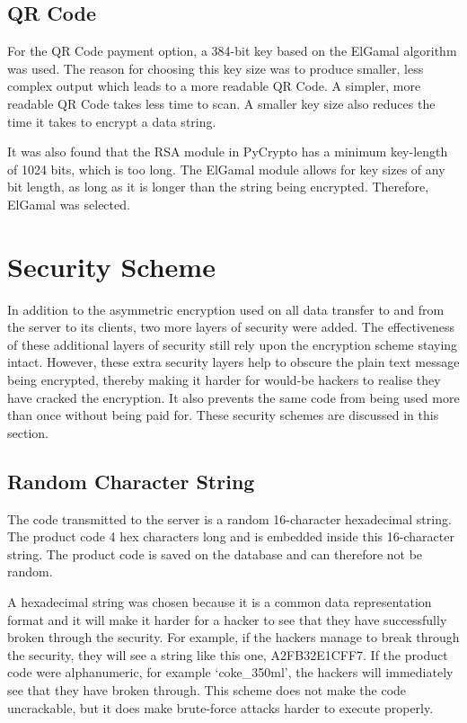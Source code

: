 \subsection{QR Code}

For the QR Code payment option, a 384-bit key based on the ElGamal algorithm was
used. The reason for choosing this key size was to produce smaller, less complex
output which leads to a more readable QR Code. A simpler, more readable QR Code
takes less time to scan. A smaller key size also reduces the time it takes to
encrypt a data string.

It was also found that the RSA module in PyCrypto has a minimum key-length of 1024
bits, which is too long. The ElGamal module allows for key sizes of any bit
length, as long as it is longer than the string being encrypted. Therefore, ElGamal was
selected. 

\section{Security Scheme}
\label{sec:security-code-scheme}

In addition to the asymmetric encryption used on all data transfer to and from
the server to its clients, two more layers of security were added. The effectiveness of
these additional layers of security still rely upon the encryption scheme staying intact.
However, these extra security layers help to obscure the plain text message being
encrypted, thereby making it harder for would-be hackers to realise they have cracked the
encryption. It also prevents the same code from being used more than once without being
paid for. These security schemes are discussed in this section. 

\subsection{Random Character String}

The code transmitted to the server is a random 16-character hexadecimal string. The
product code 4 hex characters long and is embedded inside this 16-character string.
The product code is saved on the database and can therefore not be random. 

A hexadecimal string was chosen because it is a common data representation
format and it will make it harder for a hacker to see that they have
successfully broken through the security. For example, if the hackers manage to
break through the security, they will see a string like this one, A2FB32E1CFF7. If the
product code were alphanumeric, for example `coke\_350ml', the hackers will immediately
see that they have broken through. This scheme does not make the code uncrackable, but it
does make brute-force attacks harder to execute properly.

